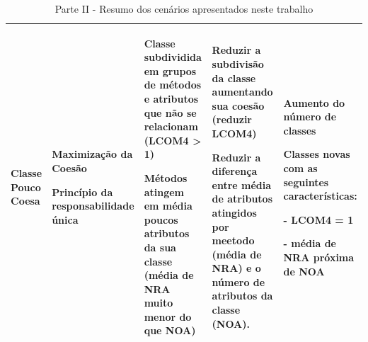\begin{landscape}
\begin{table}[hbt]
\begin{tabular}{|p{3cm}|p{4.5cm}|p{5.0cm}|p{5.5cm}|p{5.0cm}|}
\hline 
Classe Pouco Coesa
& \begin{my_itemize}
    \item Maximização da Coesão
	\item Princípio da responsabilidade única
  \end{my_itemize}
& \begin{my_itemize}                            
    \item Classe subdividida em grupos de métodos e atributos que não se relacionam (LCOM4 > 1)
	\item Métodos atingem em média poucos atributos da sua classe (média de NRA muito menor do que NOA)
  \end{my_itemize}
& \begin{my_itemize}
	\item Reduzir a subdivisão da classe aumentando sua coesão (reduzir LCOM4)
	\item Reduzir a diferença entre média de atributos atingidos por meetodo (média de NRA) e o número de atributos da classe (NOA).
  \end{my_itemize}
& \begin{my_itemize}                           
	\item Aumento do número de classes
	\item Classes novas com as seguintes características:
		\item[-] LCOM4 = 1
		\item[-] média de NRA próxima de NOA
  \end{my_itemize}
\tabularnewline                              
       


 
\hline
\end{tabular}
\caption{Parte II - Resumo dos cenários apresentados neste trabalho}
\end{table}

\end{landscape}

